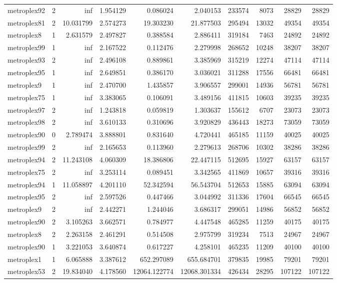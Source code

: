 \begin{longtable}{|l|r|r|r|r|r|r|r|r|r|}
metroplex92 & 2 & inf & 1.954129 & 0.086024 & 2.040153 & 233574 & 8073 & 28829 & 28829 \\
metroplex81 & 2 & 10.031799 & 2.574273 & 19.303230 & 21.877503 & 295494 & 13032 & 49354 & 49354 \\
metroplex8 & 1 & 2.631579 & 2.497827 & 0.388584 & 2.886411 & 319184 & 7463 & 24892 & 24892 \\
metroplex99 & 1 & inf & 2.167522 & 0.112476 & 2.279998 & 268652 & 10248 & 38207 & 38207 \\
metroplex93 & 2 & inf & 2.496108 & 0.889861 & 3.385969 & 315219 & 12274 & 47114 & 47114 \\
metroplex95 & 1 & inf & 2.649851 & 0.386170 & 3.036021 & 311288 & 17556 & 66481 & 66481 \\
metroplex9 & 1 & inf & 2.470700 & 1.435857 & 3.906557 & 299001 & 14936 & 56781 & 56781 \\
metroplex75 & 1 & inf & 3.383065 & 0.106091 & 3.489156 & 411815 & 10603 & 39235 & 39235 \\
metroplex97 & 2 & inf & 1.243818 & 0.059819 & 1.303637 & 155612 & 6707 & 23073 & 23073 \\
metroplex98 & 2 & inf & 3.610133 & 0.310696 & 3.920829 & 436443 & 18273 & 73059 & 73059 \\
metroplex90 & 0 & 2.789474 & 3.888801 & 0.831640 & 4.720441 & 465185 & 11159 & 40025 & 40025 \\
metroplex99 & 2 & inf & 2.165653 & 0.113960 & 2.279613 & 268706 & 10302 & 38286 & 38286 \\
metroplex94 & 2 & 11.243108 & 4.060309 & 18.386806 & 22.447115 & 512695 & 15927 & 63157 & 63157 \\
metroplex75 & 2 & inf & 3.253114 & 0.089451 & 3.342565 & 411869 & 10657 & 39316 & 39316 \\
metroplex94 & 1 & 11.058897 & 4.201110 & 52.342594 & 56.543704 & 512653 & 15885 & 63094 & 63094 \\
metroplex95 & 2 & inf & 2.597526 & 0.447466 & 3.044992 & 311336 & 17604 & 66545 & 66545 \\
metroplex9 & 2 & inf & 2.442271 & 1.244046 & 3.686317 & 299051 & 14986 & 56852 & 56852 \\
metroplex90 & 2 & 3.105263 & 3.662571 & 0.784977 & 4.447548 & 465285 & 11259 & 40175 & 40175 \\
metroplex8 & 2 & 2.263158 & 2.461291 & 0.514508 & 2.975799 & 319234 & 7513 & 24967 & 24967 \\
metroplex90 & 1 & 3.221053 & 3.640874 & 0.617227 & 4.258101 & 465235 & 11209 & 40100 & 40100 \\
metroplex1 & 1 & 6.065888 & 3.387612 & 652.297089 & 655.684701 & 379835 & 19985 & 79201 & 79201 \\
metroplex53 & 2 & 19.834040 & 4.178560 & 12064.122774 & 12068.301334 & 426434 & 28295 & 107122 & 107122 \\
\end{longtable}
